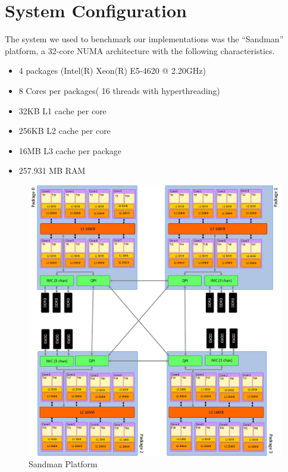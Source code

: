 

\section{System Configuration}

The system we used to benchmark our implementations was the “Sandman” platform, a 32-core NUMA architecture with the following  characteristics.

\begin{itemize}
\item 4 packages (Intel(R) Xeon(R) E5-4620 @ 2.20GHz)
\item 8 Cores per packages( 16 threads with hyperthreading)
\item 32KB L1 cache per core
\item 256KB L2 cache per core
\item 16MB L3 cache per package
\item257.931 MB RAM 
\end{itemize}

\begin{figure} 
 \centering 
  \includegraphics[scale=0.5]{sandman_architecture.png} 
\caption{Sandman Platform} 
\label{sandman_architecture} 
\end{figure} 
